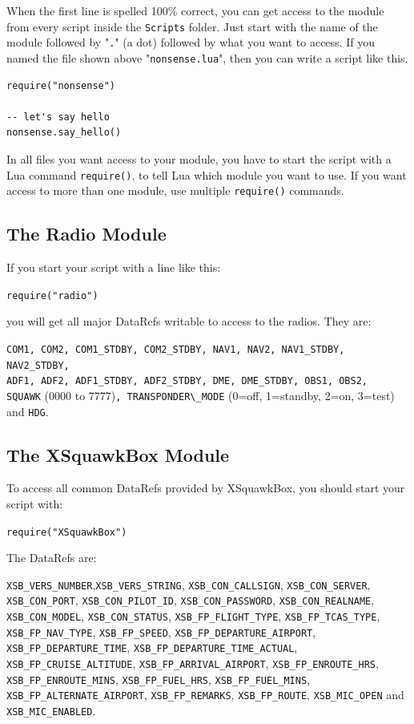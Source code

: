 \documentclass[11pt,parskip=half,a4paper]{scrartcl}
\begin{document}
When the first line is spelled 100\% correct, you can get access to the module from every script inside the \verb|Scripts| folder. Just start with the name of the module followed by "\verb|.|" (a dot) followed by what you want to access. If you named the file shown above "\verb|nonsense.lua|", then you can write a script like this.

\begin{lstlisting}
require("nonsense")

-- let's say hello
nonsense.say_hello()
\end{lstlisting}

In all files you want access to your module, you have to start the script with a Lua command \verb|require()|, to tell Lua which module you want to use. If you want access to more than one module, use multiple \verb|require()| commands.

\subsection{The Radio Module}

If you start your script with a line like this:

\verb|require("radio")|

you will get all major DataRefs writable to access to the radios. They are:

\verb|COM1, COM2, COM1_STDBY, COM2_STDBY, NAV1, NAV2, NAV1_STDBY, NAV2_STDBY,|\\
\verb|ADF1, ADF2, ADF1_STDBY, ADF2_STDBY, DME, DME_STDBY, OBS1, OBS2,|\\
\verb|SQUAWK| (0000 to 7777)\verb|, TRANSPONDER\_MODE| (0=off, 1=standby, 2=on, 3=test) and \verb|HDG|.

\subsection{The XSquawkBox Module}

To access all common DataRefs provided by XSquawkBox, you should start your script with:

\verb|require("XSquawkBox")|

The DataRefs are:

\begin{flushleft}
\verb|XSB_VERS_NUMBER|,\verb|XSB_VERS_STRING|, \verb|XSB_CON_CALLSIGN|, \verb|XSB_CON_SERVER|, \verb|XSB_CON_PORT|, \verb|XSB_CON_PILOT_ID|, \verb|XSB_CON_PASSWORD|, \verb|XSB_CON_REALNAME|, \verb|XSB_CON_MODEL|, \verb|XSB_CON_STATUS|, \verb|XSB_FP_FLIGHT_TYPE|, \verb|XSB_FP_TCAS_TYPE|, \verb|XSB_FP_NAV_TYPE|, \verb|XSB_FP_SPEED|, \verb|XSB_FP_DEPARTURE_AIRPORT|, \verb|XSB_FP_DEPARTURE_TIME|, \verb|XSB_FP_DEPARTURE_TIME_ACTUAL|, \verb|XSB_FP_CRUISE_ALTITUDE|, \verb|XSB_FP_ARRIVAL_AIRPORT|, \verb|XSB_FP_ENROUTE_HRS|, \verb|XSB_FP_ENROUTE_MINS|, \verb|XSB_FP_FUEL_HRS|, \verb|XSB_FP_FUEL_MINS|, \verb|XSB_FP_ALTERNATE_AIRPORT|, \verb|XSB_FP_REMARKS|, \verb|XSB_FP_ROUTE|, \verb|XSB_MIC_OPEN| and \verb|XSB_MIC_ENABLED|.
\end{flushleft}
\end{document}
